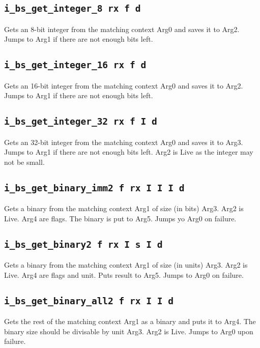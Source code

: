 \documentclass{article}
\newcommand{\iop}[1]{\texttt{#1}}
\begin{document}
\subsection*{\iop{i\_bs\_get\_integer\_8 rx f d}}

Gets an 8-bit integer from the matching context Arg0 and saves it to Arg2. Jumps
to Arg1 if there are not enough bits left.

\subsection*{\iop{i\_bs\_get\_integer\_16 rx f d}}

Gets an 16-bit integer from the matching context Arg0 and saves it to Arg2. Jumps
to Arg1 if there are not enough bits left.

\subsection*{\iop{i\_bs\_get\_integer\_32 rx f I d}}

Gets an 32-bit integer from the matching context Arg0 and saves it to Arg3. Jumps
to Arg1 if there are not enough bits left. Arg2 is Live as the integer may not
be small.

\subsection*{\iop{i\_bs\_get\_binary\_imm2 f rx I I I d}}

Gets a binary from the matching context Arg1 of size (in bits) Arg3. Arg2 is
Live. Arg4 are flags. The binary is put to Arg5. Jumps yo Arg0 on failure.

\subsection*{\iop{i\_bs\_get\_binary2 f rx I s I d}}

Gets a binary from the matching context Arg1 of size (in units) Arg3. Arg2 is
Live. Arg4 are flags and unit. Puts result to Arg5. Jumps to Arg0 on failure.

\subsection*{\iop{i\_bs\_get\_binary\_all2 f rx I I d}}

Gets the rest of the matching context Arg1 as a binary and puts it to Arg4. The
binary size should be divisable by unit Arg3. Arg2 is Live. Jumps to Arg0 upon
failure.
\end{document}
